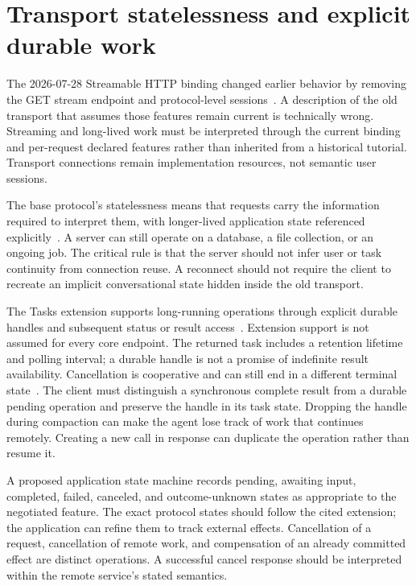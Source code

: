 \section{Transport statelessness and explicit durable work}\label{sec:C19:transport}
The 2026-07-28 Streamable HTTP binding changed earlier behavior by removing the GET stream endpoint and protocol-level sessions~\cite{mcp2026http}. A description of the old transport that assumes those features remain current is technically wrong. Streaming and long-lived work must be interpreted through the current binding and per-request declared features rather than inherited from a historical tutorial. Transport connections remain implementation resources, not semantic user sessions.

The base protocol's statelessness means that requests carry the information required to interpret them, with longer-lived application state referenced explicitly~\cite{mcp2026base}. A server can still operate on a database, a file collection, or an ongoing job. The critical rule is that the server should not infer user or task continuity from connection reuse. A reconnect should not require the client to recreate an implicit conversational state hidden inside the old transport.

The Tasks extension supports long-running operations through explicit durable handles and subsequent status or result access~\cite{mcp2026tasks}. Extension support is not assumed for every core endpoint. The returned task includes a retention lifetime and polling interval; a durable handle is not a promise of indefinite result availability. Cancellation is cooperative and can still end in a different terminal state~\cite{mcp2026tasks}. The client must distinguish a synchronous complete result from a durable pending operation and preserve the handle in its task state. Dropping the handle during compaction can make the agent lose track of work that continues remotely. Creating a new call in response can duplicate the operation rather than resume it.

A proposed application state machine records pending, awaiting input, completed, failed, canceled, and outcome-unknown states as appropriate to the negotiated feature. The exact protocol states should follow the cited extension; the application can refine them to track external effects. Cancellation of a request, cancellation of remote work, and compensation of an already committed effect are distinct operations. A successful cancel response should be interpreted within the remote service's stated semantics.

